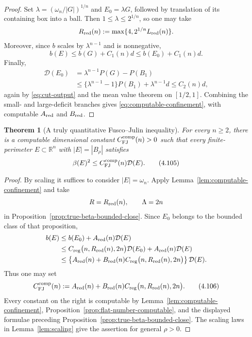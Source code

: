 \documentclass[11pt]{amsart}
\newtheorem{theorem}{Theorem}[section]
\theoremstyle{definition}
\newcommand{\R}{\mathbb R}
\newcommand{\Per}{P}
\newcommand{\Def}{\mathcal D}
\begin{document}
\begin{proof}
Set \(\lambda=(\omega_n/|G|)^{1/n}\) and
\(E_0=\lambda G\), followed by translation of its containing box into
a ball.  Then \(1\le\lambda\le2^{1/n}\), so one may take
\[
   R_{\rm red}(n):=\max\{4,2^{1/n}L_{\rm red}(n)\}.
\]
Moreover, since \(b\) scales by \(\lambda^{n-1}\) and is nonnegative,
\[
   b(E)\le b(G)+C_1(n)d\le b(E_0)+C_1(n)d.
\]
Finally,
\[
\begin{aligned}
   \Def(E_0)
   &=\lambda^{n-1}\Per(G)-\Per(B_1)\\
   &\le\{\lambda^{n-1}-1\}\Per(B_1)+\lambda^{n-1}d
    \le C_2(n)d,
\end{aligned}
\tag{4.104}\label{eq:def-cut-control}
\]
again by \eqref{eq:cut-output} and the mean value theorem on
\([1/2,1]\).  Combining the small- and large-deficit branches gives
\eqref{eq:computable-confinement}, with computable
\(A_{\rm red}\) and \(B_{\rm red}\).
\end{proof}

\begin{theorem}[A truly quantitative Fusco--Julin inequality]
\label{thm:global-computable-FJ}
For every \(n\ge2\), there is a computable dimensional constant
\(C_{\rm FJ}^{\rm comp}(n)>0\) such that every finite-perimeter
\(E\subset\R^n\) with \(|E|=|B_\rho|\) satisfies
\[
   \beta(E)^2\le C_{\rm FJ}^{\rm comp}(n)\Def(E).
\tag{4.105}\label{eq:global-computable-FJ}
\]
\end{theorem}

\begin{proof}
By scaling it suffices to consider \(|E|=\omega_n\).  Apply
Lemma~\ref{lem:computable-confinement} and take
\[
   R=R_{\rm red}(n),\qquad \Lambda=2n
\]
in Proposition~\ref{prop:true-beta-bounded-close}.  Since \(E_0\)
belongs to the bounded class of that proposition,
\[
\begin{aligned}
   b(E)
   &\le b(E_0)+A_{\rm red}(n)\Def(E)\\
   &\le C_{\rm reg}\bigl(n,R_{\rm red}(n),2n\bigr)\Def(E_0)
          +A_{\rm red}(n)\Def(E)\\
   &\le
     \left\{A_{\rm red}(n)
       +B_{\rm red}(n)C_{\rm reg}
             \bigl(n,R_{\rm red}(n),2n\bigr)\right\}\Def(E).
\end{aligned}
\]
Thus one may set
\[
   C_{\rm FJ}^{\rm comp}(n)
   :=
   A_{\rm red}(n)
       +B_{\rm red}(n)C_{\rm reg}
             \bigl(n,R_{\rm red}(n),2n\bigr).
\tag{4.106}\label{eq:CFJ-computable}
\]
Every constant on the right is computable by
Lemma~\ref{lem:computable-confinement},
Proposition~\ref{prop:flat-number-computable}, and the displayed
formulae preceding Proposition~\ref{prop:true-beta-bounded-close}.
The scaling laws in Lemma~\ref{lem:scaling} give the assertion for
general \(\rho>0\).
\end{proof}
\end{document}
